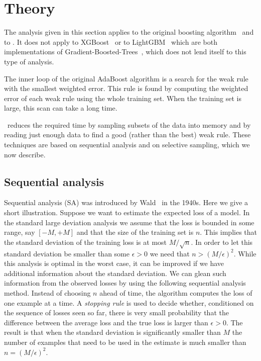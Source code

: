 \section{Theory}
The analysis given in this section applies to the original boosting
algorithm~\cite{freund_decision-theoretic_1997, schapire_improved_1999, freund_alternating_1999}
and to \Sparrow. It
does not apply to XGBoost~\cite{chen_xgboost:_2016} or to LightGBM~\cite{ke_lightgbm:_2017} which are
both implementations of Gradient-Boosted-Trees~\cite{friedman_greedy_2001}, which does not
lend itself to this type of analysis.

The inner loop of the original AdaBoost algorithm is a search for the
weak rule with the smallest weighted error. This rule is found by
computing the weighted error of each weak rule using the whole
training set. When the training set is large, this scan can take a
long time.

\Sparrow\ reduces the required time by sampling subsets of the data into
memory and by reading just enough data to find a good (rather than the
best) weak rule. These techniques are based on sequential analysis and
on selective sampling, which we now describe.

\subsection{Sequential analysis}
Sequential analysis (SA) was introduced by
Wald~\cite{wald_sequential_1973} in the 1940s.  Here we give a short
illustration. Suppose we want to estimate the expected loss of a
model. In the standard large deviation analysis we assume that the
loss is bounded in some range, say $[-M,+M]$ and that the size of the
training set is $n$. This implies that the standard deviation of the
training loss is at most $M/\sqrt{n}$. In order to let this standard
deviation be smaller than some $\epsilon>0$ we need that
$n > (M/\epsilon)^2$. While this analysis is optimal in the worst case, it
can be improved if we have additional information about the standard
deviation. We can glean such information from the observed losses by
using the following sequential analysis method. Instead of choosing
$n$ ahead of time, the algorithm computes the loss of one example at a
time. A {\em stopping rule} is used to decide whether, conditioned on
the sequence of losses seen so far, there is very small probability
that the difference between the average loss and the true loss is
larger than $\epsilon>0$. The result is that when the standard
deviation is significantly smaller than $M$ the number of examples
that need to be used in the estimate is much smaller than
$n=(M/\epsilon)^2$.

